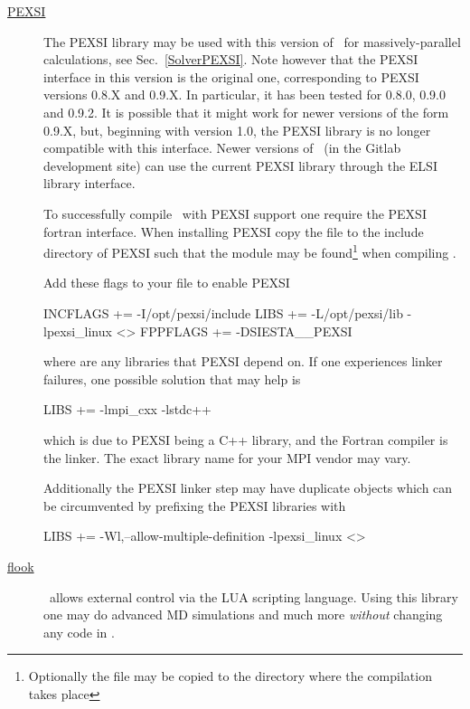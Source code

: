 \begin{description}
  \item[\href{http://pexsi.org}{PEXSI}]%
  The PEXSI library may be used with this version of \siesta\ for massively-parallel
  calculations, see Sec.~\ref{SolverPEXSI}. Note however that the
  PEXSI interface in this version is the original one, corresponding
  to PEXSI versions 0.8.X and 0.9.X. In particular, it has been tested
  for 0.8.0, 0.9.0 and 0.9.2. It is possible that it might work for 
  newer versions of the form 0.9.X, but, beginning with version 1.0,
  the PEXSI library is no longer compatible with this interface. Newer
  versions of \siesta\ (in the Gitlab development site) can use
  the current PEXSI library through the ELSI library interface.

  To successfully compile \siesta\ with PEXSI support one require the
  PEXSI fortran interface. When installing PEXSI copy the
   file to the include directory of
  PEXSI such that the module may be found\footnote{Optionally the file
      may be copied to the  directory where the compilation
      takes place} when compiling \siesta.

  Add these flags to your  file to enable PEXSI
\begin{shellexample}
  INCFLAGS += -I/opt/pexsi/include
  LIBS += -L/opt/pexsi/lib -lpexsi_linux <>
  FPPFLAGS += -DSIESTA__PEXSI
\end{shellexample}
  where \shell{<>} are any libraries that PEXSI depend on. 
  If one experiences linker failures, one possible solution that may
  help is
\begin{shellexample}
  LIBS += -lmpi_cxx -lstdc++
\end{shellexample}
  which is due to PEXSI being a C++ library, and the Fortran compiler
  is the linker. The exact library name for your MPI vendor may
  vary. 

  Additionally the PEXSI linker step may have duplicate objects which
  can be circumvented by prefixing the PEXSI libraries with
\begin{shellexample}
  LIBS += -Wl,--allow-multiple-definition -lpexsi_linux <>
\end{shellexample}


  \item[\href{https://github.com/electronicstructurelibrary/flook}{flook}]%
  \siesta\ allows external control via the LUA scripting language.
  Using this library one may do advanced MD simulations and much more
  \emph{without} changing any code in \siesta.
  

\end{description}
